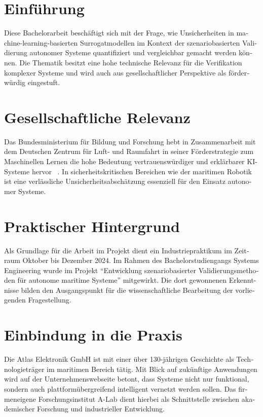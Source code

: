 \begin{otherlanguage}{ngerman}
\section{Einführung}

Diese Bachelorarbeit beschäftigt sich mit der Frage, wie Unsicherheiten in machine-learning-basierten Surrogatmodellen im Kontext der szenariobasierten Validierung autonomer Systeme quantifiziert und vergleichbar gemacht werden können. Die Thematik besitzt eine hohe technische Relevanz für die Verifikation komplexer Systeme und wird auch aus gesellschaftlicher Perspektive als förderwürdig eingestuft.

\section{Gesellschaftliche Relevanz}

Das \gls{Bundesministerium für Bildung und Forschung} hebt in Zusammenarbeit mit dem \gls{Deutschen Zentrum für Luft- und Raumfahrt} in seiner Förderstrategie zum Maschinellen Lernen die hohe Bedeutung vertrauenswürdiger und erklärbarer KI-Systeme hervor ~\parencite{bmbf2025}. In sicherheitskritischen Bereichen wie der maritimen Robotik ist eine verlässliche Unsicherheitsabschätzung essenziell für den Einsatz autonomer Systeme.

\section{Praktischer Hintergrund}

Als Grundlage für die Arbeit im Projekt dient ein Industriepraktikum im Zeitraum Oktober bis Dezember 2024. Im Rahmen des Bachelorstudiengangs Systems Engineering wurde im Projekt \enquote{Entwicklung szenariobasierter Validierungsmethoden für autonome maritime Systeme} mitgewirkt. Die dort gewonnenen Erkenntnisse bilden den Ausgangspunkt für die wissenschaftliche Bearbeitung der vorliegenden Fragestellung.

\section{Einbindung in die Praxis}

Die Atlas Elektronik GmbH ist mit einer über 130-jährigen Geschichte als Technologieträger im maritimen Bereich tätig. Mit Blick auf zukünftige Anwendungen wird auf der Unternehmenswebseite betont, dass Systeme nicht nur funktional, sondern auch plattformübergreifend intelligent vernetzt werden sollen. Das firmeneigene Forschungsinstitut A-Lab dient hierbei als Schnittstelle zwischen akademischer Forschung und industrieller Entwicklung.


\end{otherlanguage}
